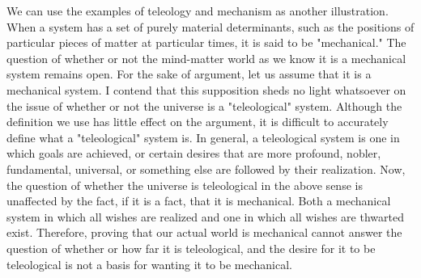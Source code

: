\documentclass[a4paper,12pt]{book}[2004/02/16]
\theoremstyle{ilemma}
\theoremstyle{itheorem}
\theoremstyle{iother}
\theoremstyle{icorollary}
\theoremstyle{numcorollary}
\theoremstyle{idefinition}
\begin{document}
We can use the examples of teleology and mechanism as another illustration. When a system has a set of purely material determinants, such as the positions of particular pieces of matter at particular times, it is said to be "mechanical." The question of whether or not the mind-matter world as we know it is a mechanical system remains open. For the sake of argument, let us assume that it is a mechanical system. I contend that this supposition sheds no light whatsoever on the issue of whether or not the universe is a "teleological" system. Although the definition we use has little effect on the argument, it is difficult to accurately define what a "teleological" system is. In general, a teleological system is one in which goals are achieved, or certain desires that are more profound, nobler, fundamental, universal, or something else are followed by their realization. Now, the question of whether the universe is teleological in the above sense is unaffected by the fact, if it is a fact, that it is mechanical. Both a mechanical system in which all wishes are realized and one in which all wishes are thwarted exist. Therefore, proving that our actual world is mechanical cannot answer the question of whether or how far it is teleological, and the desire for it to be teleological is not a basis for wanting it to be mechanical.
\end{document}

